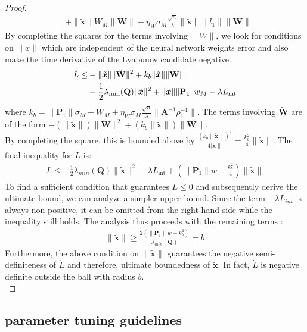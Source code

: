 \documentclass[10pt,twocolumn]{ICCAS}
\newcommand{\xtilde}{\tilde{\bm{x}}}
\newcommand{\Wtilde}{\tilde{\mathbf{W}}}
\begin{document}
\begin{proof}
\begin{align*}
    &+ \|\xtilde\| W_M \|\Wtilde\| 
    + \eta_W \sigma_M \frac{\sqrt{n}}{\lambda}\|\xtilde\| \|l_1\| \|\Wtilde\|
    \label{eq:Ldot_ineq_full}
\end{align*}
By completing the squares for the terms involving $\|\hat{W}\|$, we look for conditions on $\|x\|$ which are independent of the neural network weights error and also make the time derivative of the Lyapunov candidate negative.
\begin{align}
    \dot{L} \le & - \|\xtilde\| \|\Wtilde\|^2 + k_b\|\xtilde\| \|\Wtilde\| \notag \\
    & - \frac{1}{2}\lambda_{\min}(\mathbf{Q})\|\xtilde\|^2 
    + \|\xtilde\|\|\mathbf{P}_1\|w_M 
    - \lambda L_{\text{int}}
\end{align}
where $k_b = \|\mathbf{P}_1\|\sigma_M + W_M + \eta_W\sigma_M \frac{\sqrt{n}}{\lambda} \|\mathbf{A}^{-1}\rho_1^{-1}\|$. The terms involving $\Wtilde$ are of the form $-(\|\xtilde\|)\|\Wtilde\|^2 + (k_b\|\xtilde\|)\|\Wtilde\|$.\\ 
By completing the square, this is bounded above by $\frac{(k_b\|\xtilde\|)^2}{4|\xtilde\|} = \frac{k_b^2}{4}\|\xtilde\|$.
The final inequality for $\dot{L}$ is:
\begin{align}
    \dot{L} \le -\frac{1}{2}\lambda_{min}(\mathbf{Q})\|\xtilde\|^2 - \lambda L_{\text{int}}+ \left( \|\mathbf{P}_1\|\bar{w} + \frac{k_b^2}{4} \right)\|\xtilde\|
\end{align}
To find a sufficient condition that guarantees $\dot{L} \le 0$ and subsequently derive the ultimate bound, we can analyze a simpler upper bound. Since the term $-\lambda L_{int}$ is always non-positive, it can be omitted from the right-hand side while the inequality still holds. The analysis thus proceeds with the remaining terms :
\begin{align}
    \|\xtilde\|\ge\frac{2\left( \|\mathbf{P}_1\|\bar{w} + k_b^2 \right)}{\lambda_{min}(\mathbf{Q})}=b
\end{align}
Furthermore, the above condition on $\|\xtilde\|$ guarantees the negative semi-definiteness of $\dot{L}$ and therefore, ultimate boundedness of $\xtilde$.
In fact, $\dot{L}$ is negative definite outside the ball with radius $b$.\\ 

\end{proof}

\subsection{parameter tuning guidelines}
\end{document}

